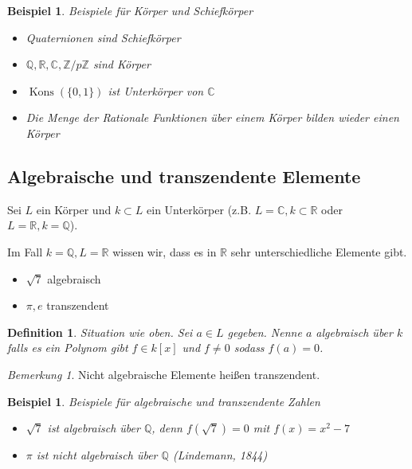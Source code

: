 \documentclass[a4paper,12pt,numbers=noenddot,parskip=full]{scrartcl}
\newcommand{\setZ}{\mathbb{Z}}
\newcommand{\setQ}{\mathbb{Q}}
\newcommand{\setR}{\mathbb{R}}
\newcommand{\setC}{\mathbb{C}}
\DeclareMathOperator{\Kons}{Kons}
\theoremstyle{dotless}
\newtheorem{definition}[theorem]{Definition}
\newtheorem{example}[theorem]{Beispiel}
\theoremstyle{remark}
\newtheorem*{remark}{Bemerkung}
\begin{document}
	\begin{example}
		Beispiele für Körper und Schiefkörper
		\begin{itemize}
			\item Quaternionen sind Schiefkörper
			\item $\setQ, \setR, \setC, \setZ / p \setZ$ sind Körper
			\item $\Kons(\{ 0 , 1 \})$ ist Unterkörper von $\setC$
			\item Die Menge der Rationale Funktionen über einem Körper bilden wieder einen Körper
		\end{itemize}
	\end{example}

	\subsection{Algebraische und transzendente Elemente}
	
	Sei $L$ ein Körper und $k \subset L$ ein Unterkörper (z.B. $L = \setC, k \subset \setR$ oder $L = \setR, k = \setQ$).
	
	Im Fall $k = \setQ, L = \setR$ wissen wir, dass es in $\setR$ sehr unterschiedliche Elemente gibt.
	
	\begin{itemize}
		\item $\sqrt{7}$ \textellipsis algebraisch
		\item $\pi, e$ \textellipsis transzendent
	\end{itemize}

	\begin{definition}
		Situation wie oben. Sei $a \in L$ gegeben. Nenne $a$ algebraisch über $k$ falls es ein Polynom gibt $f \in k[x]$ und $f \neq 0$ sodass $f(a) = 0$.
	\end{definition}

	\begin{remark}
		Nicht algebraische Elemente heißen transzendent.
	\end{remark}

	\begin{example}
		Beispiele für algebraische und transzendente Zahlen
		\begin{itemize}
			\item $\sqrt{7}$ ist algebraisch über $\setQ$, denn $f(\sqrt{7}) = 0$ mit $f(x) = x^2 - 7$
			\item $\pi$ ist nicht algebraisch über $\setQ$ (Lindemann, 1844)
		\end{itemize}
	\end{example}
\end{document}
